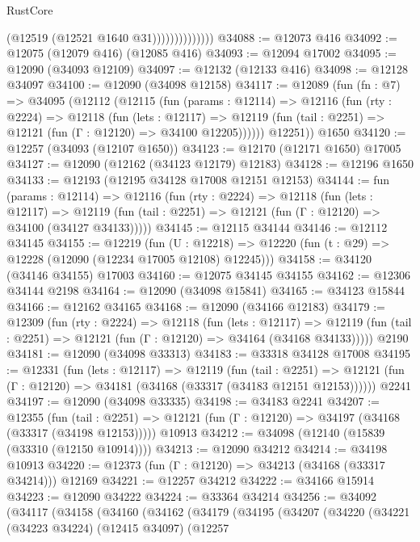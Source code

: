 \begin{lexlean}{RustCore}
\begin{coremodule}
                            (@12519 (@12521 @1640 @31))))))))))))))
@34088 := @12073 @416
@34092 := @12075 (@12079 @416) (@12085 @416)
@34093 := @12094 @17002
@34095 := @12090 (@34093 @12109)
@34097 := @12132 (@12133 @416)
@34098 := @12128 @34097
@34100 := @12090 (@34098 @12158)
@34117 := @12089
    (fun (fn : @7) =>
    @34095
      (@12112
        (@12115
          (fun (params : @12114) =>
          @12116
            (fun (rty : @2224) =>
            @12118
              (fun (lets : @12117) =>
              @12119 (fun (tail : @2251) => @12121 (fun (Γ : @12120) => @34100 @12205))))))
        @12251))
    @1650
@34120 := @12257 (@34093 (@12107 @1650))
@34123 := @12170 (@12171 @1650) @17005
@34127 := @12090 (@12162 (@34123 @12179) @12183)
@34128 := @12196 @1650
@34133 := @12193 (@12195 @34128 @17008 @12151 @12153)
@34144 := fun (params : @12114) =>
  @12116
    (fun (rty : @2224) =>
    @12118
      (fun (lets : @12117) =>
      @12119 (fun (tail : @2251) => @12121 (fun (Γ : @12120) => @34100 (@34127 @34133)))))
@34145 := @12115 @34144
@34146 := @12112 @34145
@34155 := @12219
    (fun (U : @12218) => @12220 (fun (t : @29) => @12228 (@12090 (@12234 @17005 @12108) @12245)))
@34158 := @34120 (@34146 @34155) @17003
@34160 := @12075 @34145 @34155
@34162 := @12306 @34144 @2198
@34164 := @12090 (@34098 @15841)
@34165 := @34123 @15844
@34166 := @12162 @34165
@34168 := @12090 (@34166 @12183)
@34179 := @12309
    (fun (rty : @2224) =>
    @12118
      (fun (lets : @12117) =>
      @12119 (fun (tail : @2251) => @12121 (fun (Γ : @12120) => @34164 (@34168 @34133)))))
    @2190
@34181 := @12090 (@34098 @33313)
@34183 := @33318 @34128 @17008
@34195 := @12331
    (fun (lets : @12117) =>
    @12119
      (fun (tail : @2251) =>
      @12121 (fun (Γ : @12120) => @34181 (@34168 (@33317 (@34183 @12151 @12153))))))
    @2241
@34197 := @12090 (@34098 @33335)
@34198 := @34183 @2241
@34207 := @12355
    (fun (tail : @2251) => @12121 (fun (Γ : @12120) => @34197 (@34168 (@33317 (@34198 @12153)))))
    @10913
@34212 := @34098 (@12140 (@15839 (@33310 (@12150 @10914))))
@34213 := @12090 @34212
@34214 := @34198 @10913
@34220 := @12373 (fun (Γ : @12120) => @34213 (@34168 (@33317 @34214))) @12169
@34221 := @12257 @34212
@34222 := @34166 @15914
@34223 := @12090 @34222
@34224 := @33364 @34214
@34256 := @34092
    (@34117
      (@34158
        (@34160
          (@34162
            (@34179
              (@34195
                (@34207
                  (@34220
                    (@34221
                      (@34223 @34224)
                      (@12415 @34097)
                      (@12257

\end{coremodule}
\end{lexlean}
